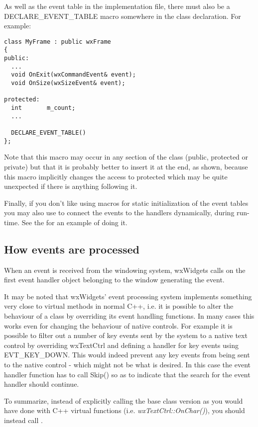 As well as the event table in the implementation file, there must also be a
DECLARE\_EVENT\_TABLE macro somewhere in the class declaration. For example:

{\small%
\begin{verbatim}
class MyFrame : public wxFrame
{
public:
  ...
  void OnExit(wxCommandEvent& event);
  void OnSize(wxSizeEvent& event);

protected:
  int       m_count;
  ...

  DECLARE_EVENT_TABLE()
};
\end{verbatim}
}%

Note that this macro may occur in any section of the class (public, protected
or private) but that it is probably better to insert it at the end, as shown,
because this macro implicitly changes the access to protected which may be
quite unexpected if there is anything following it.

Finally, if you don't like using macros for static initialization of the event
tables you may also use  to
connect the events to the handlers dynamically, during run-time. See the
 for an example of doing it.


\subsection{How events are processed}\label{eventprocessing}

When an event is received from the windowing system, wxWidgets calls 
 on the first
event handler object belonging to the window generating the event.

It may be noted that wxWidgets' event processing system implements something
very close to virtual methods in normal C++, i.e. it is possible to alter
the behaviour of a class by overriding its event handling functions. In
many cases this works even for changing the behaviour of native controls.
For example it is possible to filter out a number of key events sent by the
system to a native text control by overriding wxTextCtrl and defining a
handler for key events using EVT\_KEY\_DOWN. This would indeed prevent
any key events from being sent to the native control - which might not be
what is desired. In this case the event handler function has to call Skip()
so as to indicate that the search for the event handler should continue.

To summarize, instead of explicitly calling the base class version as you
would have done with C++ virtual functions (i.e. {\it wxTextCtrl::OnChar()}),
you should instead call .

